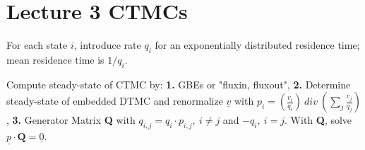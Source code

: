 \section{Lecture 3 CTMCs}
For each state $i$, introduce rate $q_{i}$ for an exponentially distributed residence time; mean residence time is $1/q_{i}$.

Compute steady-state of CTMC by: \textbf{1.} GBEs or "fluxin, fluxout", \textbf{2.} Determine steady-state of embedded DTMC and renormalize $\underline{v}$ with $p_{i} = (\frac{v_{i}}{q_{i}})\ div\ (\sum_{j} \frac{v_{j}}{q_{j}})$, \textbf{3.} Generator Matrix \textbf{Q} with $q_{i,j} = q_{i} \cdot p_{i,j},\ i \neq j$ and $-q_{i},\ i=j$. With \textbf{Q}, solve $\underline{p} \cdot \textbf{Q} = \underline{0}$.\\
